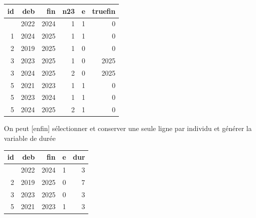 \documentclass[
  12pt,
  letterpaper,
  DIV=11,
  numbers=noendperiod,
  onepage,
  openany]{scrreprt}
\newenvironment{Shaded}{\begin{snugshade}}{\end{snugshade}}
\newcommand{\AttributeTok}[1]{\textcolor[rgb]{0.80,0.80,0.80}{#1}}
\newcommand{\DecValTok}[1]{\textcolor[rgb]{0.86,0.86,0.80}{#1}}
\newcommand{\FunctionTok}[1]{\textcolor[rgb]{0.94,0.94,0.56}{#1}}
\newcommand{\NormalTok}[1]{\textcolor[rgb]{0.80,0.80,0.80}{#1}}
\newcommand{\OtherTok}[1]{\textcolor[rgb]{0.94,0.94,0.56}{#1}}
\newcommand{\SpecialCharTok}[1]{\textcolor[rgb]{0.86,0.64,0.64}{#1}}
\begin{document}
\begin{longtable}[]{@{}rrrrrr@{}}
\toprule\noalign{}
id & deb & fin & n23 & e & truefin \\
\midrule\noalign{}
\endhead
\bottomrule\noalign{}
\endlastfoot
1 & 2022 & 2024 & 1 & 1 & 0 \\
1 & 2024 & 2025 & 1 & 1 & 0 \\
2 & 2019 & 2025 & 1 & 0 & 0 \\
3 & 2023 & 2025 & 1 & 0 & 2025 \\
3 & 2024 & 2025 & 2 & 0 & 2025 \\
5 & 2021 & 2023 & 1 & 1 & 0 \\
5 & 2023 & 2024 & 1 & 1 & 0 \\
5 & 2024 & 2025 & 2 & 1 & 0 \\
\end{longtable}

On peut {[}enfin{]} sélectionner et conserver une seule ligne par
individu et générer la variable de durée

\begin{Shaded}
\end{Shaded}

\begin{longtable}[]{@{}rrrrr@{}}
\toprule\noalign{}
id & deb & fin & e & dur \\
\midrule\noalign{}
\endhead
\bottomrule\noalign{}
\endlastfoot
1 & 2022 & 2024 & 1 & 3 \\
2 & 2019 & 2025 & 0 & 7 \\
3 & 2023 & 2025 & 0 & 3 \\
5 & 2021 & 2023 & 1 & 3 \\
\end{longtable}
\end{document}
